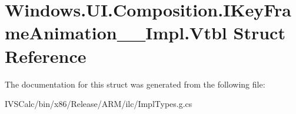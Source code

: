 \hypertarget{struct_windows_1_1_u_i_1_1_composition_1_1_i_key_frame_animation_____impl_1_1_vtbl}{}\section{Windows.\+U\+I.\+Composition.\+I\+Key\+Frame\+Animation\+\_\+\+\_\+\+Impl.\+Vtbl Struct Reference}
\label{struct_windows_1_1_u_i_1_1_composition_1_1_i_key_frame_animation_____impl_1_1_vtbl}


The documentation for this struct was generated from the following file\+:\begin{DoxyCompactItemize}
\item 
I\+V\+S\+Calc/bin/x86/\+Release/\+A\+R\+M/ilc/Impl\+Types.\+g.\+cs\end{DoxyCompactItemize}
